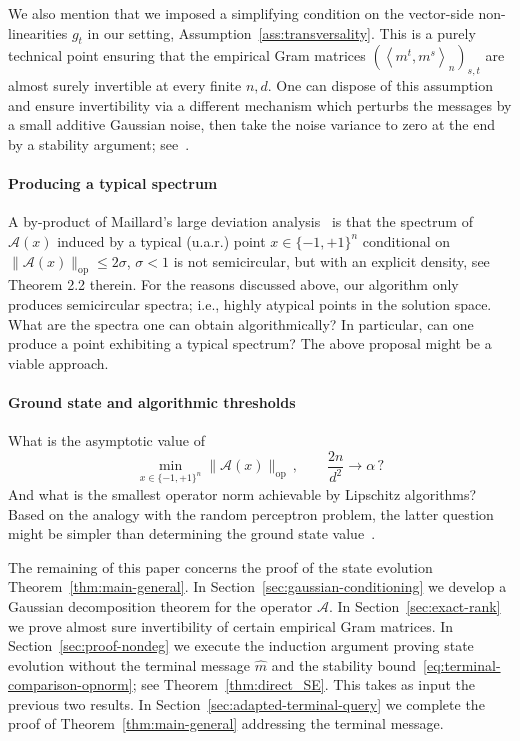 \documentclass[11pt]{article}
\theoremstyle{definition}
\theoremstyle{remark}
\numberwithin{equation}{section}
\numberwithin{theorem}{section}
\newcommand{\op}{\mathrm{op}}
\newcommand{\ip}[2]{\left\langle #1,#2\right\rangle}
\newcommand{\cA}{\mathcal A}
\begin{document}
We also mention that we imposed a simplifying condition on the vector-side non-linearities $g_t$ in our setting, Assumption~\ref{ass:transversality}. This is a purely technical point ensuring that the empirical Gram matrices $(\ip{m^t}{m^s}_n)_{s,t}$ are almost surely invertible at every finite $n,d$. One can dispose of this assumption and ensure invertibility via a different mechanism which perturbs the messages by a small additive Gaussian noise, then take the noise variance to zero at the end by a stability argument; see~\cite{berthier2017state}. 

\paragraph{Producing a typical spectrum} A by-product of Maillard's large deviation analysis~\cite{maillard2025average} is that the spectrum of $\cA(x)$ induced by a typical (u.a.r.) point $x \in \{-1,+1\}^n$ conditional on $\|\cA(x)\|_{\op}\le 2\sigma$, $\sigma<1$ is not semicircular, but with an explicit density, see Theorem 2.2 therein. For the reasons discussed above, our algorithm only produces semicircular spectra; i.e., highly atypical points in the solution space. What are the spectra one can obtain algorithmically? In particular, can one produce a point exhibiting a typical spectrum? The above proposal might be a viable approach.        
 
\paragraph{Ground state and algorithmic thresholds} What is the asymptotic value of 
\[\min_{x \in \{-1,+1\}^n} \|\cA(x)\|_{\op}\,,\qquad \frac{2n}{d^2} \to \alpha\,?\]        
And what is the smallest operator norm achievable by Lipschitz algorithms? Based on the analogy with the random perceptron problem, the latter question might be simpler than determining the ground state value~\cite{huang2026algorithmic}.  

\vspace{0.3cm}
The remaining of this paper concerns the proof of the state evolution Theorem~\ref{thm:main-general}. In Section~\ref{sec:gaussian-conditioning} we develop a Gaussian decomposition theorem for the operator $\cA$. In Section~\ref{sec:exact-rank} we prove almost sure invertibility of certain empirical Gram matrices. In Section~\ref{sec:proof-nondeg} we execute the induction argument proving state evolution without the terminal message $\widehat m$ and the stability bound~\eqref{eq:terminal-comparison-opnorm}; see Theorem~\ref{thm:direct_SE}.  This takes as input the previous two results. In Section~\ref{sec:adapted-terminal-query} we complete the proof of Theorem~\ref{thm:main-general} addressing the terminal message.        
\end{document}
